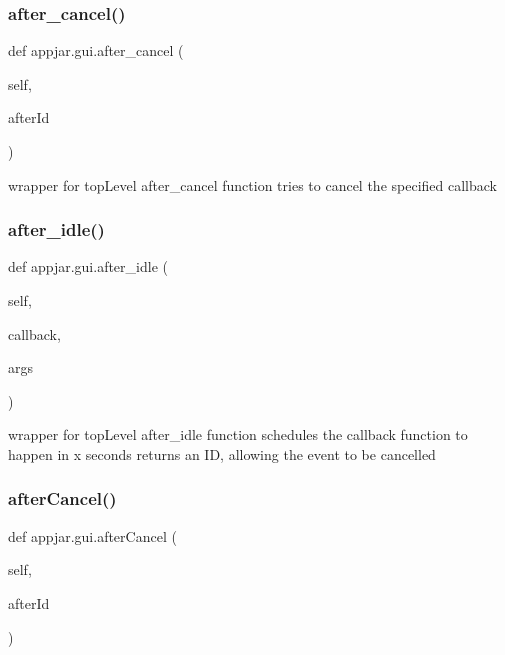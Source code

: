 \subsubsection{\texorpdfstring{after\+\_\+cancel()}{after\_cancel()}}
{\footnotesize\ttfamily def appjar.\+gui.\+after\+\_\+cancel (\begin{DoxyParamCaption}\item[{}]{self,  }\item[{}]{after\+Id }\end{DoxyParamCaption})}

\begin{DoxyVerb}wrapper for topLevel after_cancel function
    tries to cancel the specified callback \end{DoxyVerb}
 \mbox{\label{classappjar_1_1gui_ac77f7de243bdc2768c5e6bb4ed27c6fe}} 
\subsubsection{\texorpdfstring{after\+\_\+idle()}{after\_idle()}}
{\footnotesize\ttfamily def appjar.\+gui.\+after\+\_\+idle (\begin{DoxyParamCaption}\item[{}]{self,  }\item[{}]{callback,  }\item[{}]{args }\end{DoxyParamCaption})}

\begin{DoxyVerb}wrapper for topLevel after_idle function
    schedules the callback function to happen in x seconds
    returns an ID, allowing the event to be cancelled \end{DoxyVerb}
 \mbox{\label{classappjar_1_1gui_adfcc77d386733b2a33fbddfad831f336}} 
\subsubsection{\texorpdfstring{after\+Cancel()}{afterCancel()}}
{\footnotesize\ttfamily def appjar.\+gui.\+after\+Cancel (\begin{DoxyParamCaption}\item[{}]{self,  }\item[{}]{after\+Id }\end{DoxyParamCaption})}

